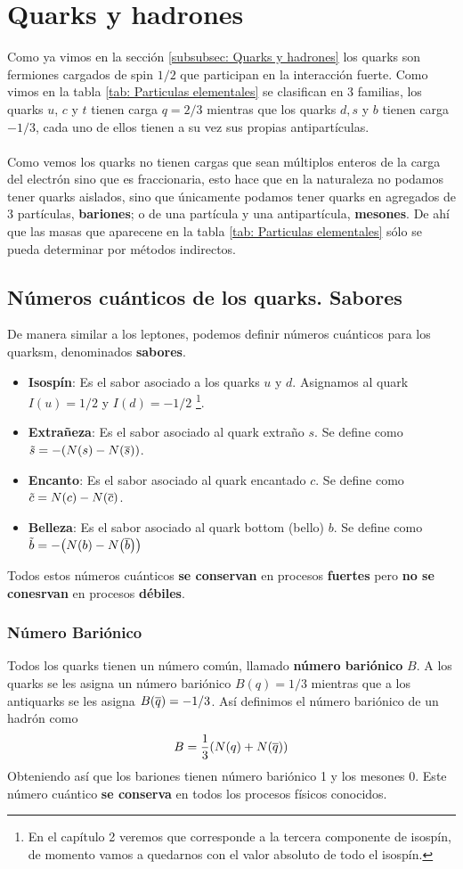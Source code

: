 \section{Quarks y hadrones}
Como ya vimos en la sección \ref{subsubsec: Quarks y hadrones} los quarks son fermiones cargados de spin $1/2$ que participan en la interacción fuerte. Como vimos en la tabla \ref{tab: Particulas elementales} se clasifican en 3 familias, los quarks $u$, $c$ y $t$ tienen carga $q=2/3$ mientras que los quarks $d,s$ y $b$ tienen carga $-1/3$, cada uno de ellos tienen a su vez sus propias antipartículas. \\\\ 
Como vemos los quarks no tienen cargas que sean múltiplos enteros de la carga del electrón sino que es fraccionaria, esto hace que en la naturaleza no podamos tener quarks aislados, sino que únicamente podamos tener quarks en agregados de 3 partículas, \textbf{bariones}; o de una partícula y una antipartícula, \textbf{mesones}. De ahí que las masas que aparecene en la tabla \ref{tab: Particulas elementales} sólo se pueda determinar por métodos indirectos.
\subsection{Números cuánticos de los quarks. Sabores}
De manera similar a los leptones, podemos definir números cuánticos para los quarksm, denominados \textbf{sabores}. 
\begin{itemize}
    \item \textbf{Isospín}: Es el sabor asociado a los quarks $u$ y $d$. Asignamos al quark $I(u)=1/2$ y $I(d)=-1/2$ \footnote{En el capítulo 2 veremos que corresponde a la tercera componente de isospín, de momento vamos a quedarnos con el valor absoluto de todo el isospín.}.
    \item \textbf{Extrañeza}: Es el sabor asociado al quark extraño $s$. Se define como $\Tilde{s}=-\qty(N\qty(s)-N\qty(\overline{s}))$.
    \item  \textbf{Encanto}: Es el sabor asociado al quark encantado $c$. Se define como $\Tilde{c}=N\qty(c)-N\qty(\overline{c})$.
    \item \textbf{Belleza}: Es el sabor asociado al quark bottom (bello) $b$. Se define como $\Tilde{b}=-\qty(N\qty(b)-N\qty(\overline{b}))$
\end{itemize}
Todos estos números cuánticos \textbf{se conservan} en procesos \textbf{fuertes} pero \textbf{no se conesrvan} en procesos \textbf{débiles}.
\subsubsection{Número Bariónico}
Todos los quarks tienen un número común, llamado \textbf{número bariónico} $B$. A los quarks se les asigna un número bariónico $B(q)=1/3$ mientras que a los antiquarks se les asigna $B\qty(\overline{q})=-1/3$. Así definimos el número bariónico de un hadrón como \begin{equation}
    B=\frac{1}{3} \qty(N(q)+N\qty(\overline{q}))
\end{equation}
Obteniendo así que los bariones tienen número bariónico 1 y los mesones 0. Este número cuántico \textbf{se conserva} en todos los procesos físicos conocidos. 

